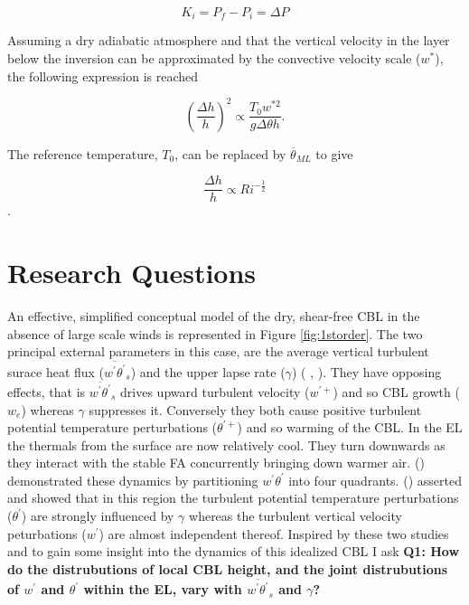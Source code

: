 \begin{equation}
K_{i} = P_{f} - P_{i} = \Delta P
\end{equation}

Assuming a dry adiabatic atmosphere and that the vertical velocity in the layer below the inversion can be approximated by the convective velocity scale ($w^{*}$), the following expression is reached

\begin{equation}
\left(\frac{\Delta h}{h}\right)^{2} \propto \frac{T_{0} w^{*2}}{g \Delta \theta h}.
\end{equation}

The reference temperature, $T_{0}$, can be replaced by $\overline{\theta}_{ML}$ to give

\begin{equation}
\frac{\Delta h}{h} \propto Ri^{-\frac{1}{2}}
\end{equation}.



\section{Research Questions}
\label{sec:resquest}

An effective, simplified conceptual model of the dry, shear-free \acs{CBL} in the absence of large scale winds is represented in Figure \ref{fig:1storder}.  The two principal external parameters in this case, are the average vertical turbulent surace heat flux ($\overline{w^{'}\theta^{'}}_{s}$) and the upper lapse rate ($\gamma$) (\citeauthor{FedConzMir04} \citeyear{FedConzMir04},\citeauthor{Sorbjan} \citeyear{Sorbjan}).  They have opposing effects, that is $\overline{w^{'}\theta^{'}}_{s}$ drives upward turbulent velocity ($w^{'+}$) and so \acs{CBL} growth ($w_{e}$) whereas $\gamma$  suppresses it.  Conversely they both cause positive turbulent potential temperature perturbations ($\theta^{'+}$) and so warming of the \acs{CBL}.  In the \acs{EL} the thermals from the surface are now relatively cool.  They turn downwards as they interact with the stable \acs{FA} concurrently bringing down warmer air.  \citeauthor{SullMoengStev} (\citeyear{SullMoengStev}) demonstrated these dynamics by partitioning $w^{'} \theta^{'}$ into four quadrants.  \citeauthor{Sorbjan} (\citeyear{Sorbjan}) asserted and showed that in this region the turbulent potential temperature perturbations ($\theta^{'}$) are strongly influenced by $\gamma$ whereas the turbulent vertical velocity peturbations ($w^{'}$) are almost independent thereof. Inspired by these two studies and to gain some insight into the dynamics of this idealized \acs{CBL} I ask \textbf{Q1: How do the distrubutions of local \acs{CBL} height, and the joint distrubutions of $w^{'}$ and $\theta^{'}$ within the \acs{EL}, vary with $\overline{w^{'}\theta^{'}}_{s}$ and $\gamma$?}\\

